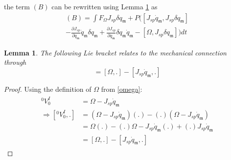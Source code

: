 \documentclass[lettersize,journal]{IEEEtran}
\newtheorem{lemma}[theorem]{Lemma}
\begin{document}
\begin{itemize}
the term $(B)$ can be rewritten using Lemma \ref{lemmabracket} as
\begin{multline}
    (B)= \int F_{\Omega}J_{sp}\delta q_\mathfrak{m} + P([J_{sp}\dot{q}_\mathfrak{m},J_{sp}\delta q_\mathfrak{m}]\\
    -\frac{\partial J_{sp}}{\partial q_\mathfrak{m}}\dot{q}_\mathfrak{m}\delta q_\mathfrak{m}
    +\frac{\partial J_{sp}}{\partial q_\mathfrak{m}}\delta q_\mathfrak{m} \dot{q}_\mathfrak{m}-[\Omega,J_{sp}\delta q_\mathfrak{m}])dt
    \label{finalB}
\end{multline}
\begin{lemma}\label{lemmabracket}
The following Lie bracket relates to the mechanical connection through
\begin{equation}
    [{}^0V^I_0,.]=[\Omega,.]-[J_{sp}\dot{q}_\mathfrak{m},.]
\end{equation}
\end{lemma}
\begin{proof}[Proof]
Using the definition of $\Omega$ from \eqref{omega}:
\begin{align}
    \begin{split}
    {}^0V^I_0 &=\Omega-J_{sp}\dot{q}_\mathfrak{m}\\
        \Rightarrow [{}^0V^I_0,.] &=(\Omega-J_{sp}\dot{q}_\mathfrak{m})(.)-(.)(\Omega-J_{sp}\dot{q}_\mathfrak{m})\\
        &=\Omega(.)-(.)\Omega-J_{sp}\dot{q}_\mathfrak{m}(.)+(.)J_{sp}\dot{q}_\mathfrak{m}\\
        &=[\Omega,.]-[J_{sp}\dot{q}_\mathfrak{m},.]
    \end{split}
\end{align}
\end{proof}
\end{itemize}

\end{document}
